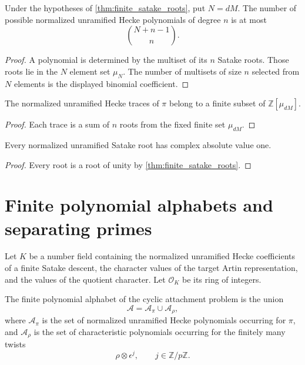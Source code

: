 \documentclass{aomart}
\theoremstyle{definition}
\theoremstyle{remark}
\newcommand{\ZZ}{\mathbb Z}
\newcommand{\OO}{\mathcal O}
\newcommand{\calA}{\mathcal A}
\begin{document}
\begin{proposition}\label{prop:finite_number_hecke}
Under the hypotheses of \cref{thm:finite_satake_roots}, put \(N=dM\). The number of possible normalized unramified Hecke polynomials of degree \(n\) is at most
\[
 \boxed{
 \binom{N+n-1}{n}.
 }
\]
\end{proposition}

\begin{proof}
A polynomial is determined by the multiset of its \(n\) Satake roots. Those roots lie in the \(N\) element set \(\mu_N\). The number of multisets of size \(n\) selected from \(N\) elements is the displayed binomial coefficient.
\end{proof}

\begin{corollary}\label{cor:finite_trace_alphabet}
The normalized unramified Hecke traces of \(\pi\) belong to a finite subset of \(\ZZ[\mu_{dM}]\).
\end{corollary}

\begin{proof}
Each trace is a sum of \(n\) roots from the fixed finite set \(\mu_{dM}\).
\end{proof}

\begin{corollary}\label{cor:unramified_ramanujan}
Every normalized unramified Satake root has complex absolute value one.
\end{corollary}

\begin{proof}
Every root is a root of unity by \cref{thm:finite_satake_roots}.
\end{proof}


\section{Finite polynomial alphabets and separating primes}\label{sec:separating_primes}

Let \(K\) be a number field containing the normalized unramified Hecke coefficients of a finite Satake descent, the character values of the target Artin representation, and the values of the quotient character. Let \(\OO_K\) be its ring of integers.

\begin{definition}\label{def:finite_alphabet}
The finite polynomial alphabet of the cyclic attachment problem is the union
\[
\calA
=
\calA_{\pi}
\cup
\calA_{\rho},
\]
where \(\calA_{\pi}\) is the set of normalized unramified Hecke polynomials occurring for \(\pi\), and \(\calA_{\rho}\) is the set of characteristic polynomials occurring for the finitely many twists
\[
\rho\otimes\epsilon^j,
\qquad
j\in\ZZ/p\ZZ.
\]
\end{definition}
\end{document}

